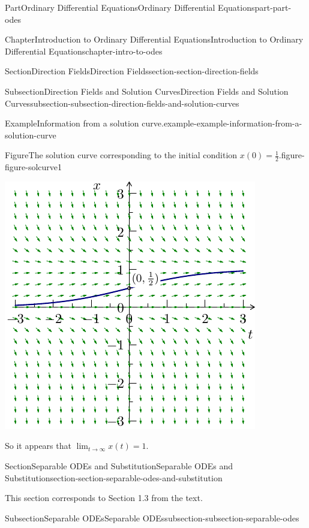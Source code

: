 \documentclass[twoside,10pt,]{book}
\numberwithin{equation}{part}
\begin{document}
\begin{partptx}{Part}{Ordinary Differential Equations}{}{Ordinary Differential Equations}{}{}{part-part-odes}
\begin{chapterptx}{Chapter}{Introduction to Ordinary Differential Equations}{}{Introduction to Ordinary Differential Equations}{}{}{chapter-intro-to-odes}
\begin{sectionptx}{Section}{Direction Fields}{}{Direction Fields}{}{}{section-section-direction-fields}
\begin{subsectionptx}{Subsection}{Direction Fields and Solution Curves}{}{Direction Fields and Solution Curves}{}{}{subsection-subsection-direction-fields-and-solution-curves}
\begin{example}{Example}{Information from a solution curve.}{example-example-information-from-a-solution-curve}
\begin{figureptx}{Figure}{The solution curve corresponding to the initial condition \(x(0) = \frac{1}{2}\).}{figure-figure-solcurve1}{}
\begin{image}{0.25}{0.5}{0.25}{}
\includegraphics[width=\linewidth]{generated/asymptote/image-5.pdf}
\end{image}%
\tcblower
\end{figureptx}%
So it appears that \(\lim_{t\to\infty}x(t) = 1\).%
\end{example}
\end{subsectionptx}
\end{sectionptx}
%
%
\typeout{************************************************}
\typeout{************************************************}
%
\begin{sectionptx}{Section}{Separable ODEs and Substitution}{}{Separable ODEs and Substitution}{}{}{section-section-separable-odes-and-substitution}
\begin{introduction}{}%
This section corresponds to Section 1.3 from the text.%
\end{introduction}%
%
%
\typeout{************************************************}
\typeout{************************************************}
%
\begin{subsectionptx}{Subsection}{Separable ODEs}{}{Separable ODEs}{}{}{subsection-subsection-separable-odes}

\end{subsectionptx}
\end{sectionptx}
\end{chapterptx}
\end{partptx}
\end{document}
